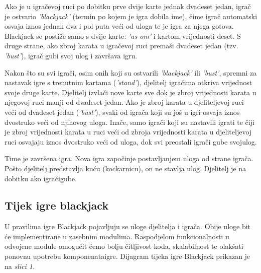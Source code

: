 \documentclass[conference]{IEEEtran}
\begin{document}
Ako je u igračevoj ruci po dobitku prve dvije karte jednak dvadeset jedan, igrač je ostvario \textit{'blackjack'} (termin po kojem je igra dobila ime), čime igrač automatski osvaja iznos jednak dva i pol puta veći od uloga te je igra za njega gotova. Blackjack se postiže samo s dvije karte: \textit{'as-om'} i kartom vrijednosti deset. S druge strane, ako zbroj karata u igračevoj ruci premaši  dvadeset jedan (tzv. \textit{'bust'}), igrač gubi svoj ulog i završava igru. 

Nakon što su svi igrači, osim onih koji su ostvarili \textit{'blackjack'} ili \textit{'bust'}, spremni za nastavak igre s trenutnim kartama (\textit{'stand'}), djelitelj igračima otkriva vrijednost svoje druge karte. Djelitelj izvlači nove karte sve dok je zbroj vrijednosti karata u njegovoj ruci manji od dvadeset jedan. Ako je zbroj karata u djeliteljevoj ruci veći od dvadeset jedan (\textit{'bust'}), svaki od igrača koji su još u igri osvaja iznos dvostruko veći od njihovog uloga. Inače, samo igrači koji su nastavili igrati te čiji je zbroj vrijednosti karata u ruci veći od zbroja vrijednosti karata u djeliteljevoj ruci osvajaju iznos dvostruko veći od uloga, dok svi preostali igrači gube svoj\break ulog. 

Time je završena igra. Nova igra započinje postavljanjem uloga od strane igrača. Pošto djelitelj predstavlja kuću (kockarnicu), on ne stavlja ulog. Djelitelj je na dobitku ako igrači\break gube.

\newpage

\subsection{Tijek igre blackjack}

U pravilima igre Blackjack pojavljuju se uloge djelitelja i igrača. Obije uloge bit će implementirane u zasebnim modulima. Raspodjelom funkcionalnosti u odvojene module omogućit ćemo bolju čitljivost koda, skalabilnost te olakšati ponovnu upotrebu komponenata\break igre. Dijagram tijeka igre Blackjack prikazan je na \textit{slici 1}.
\end{document}
